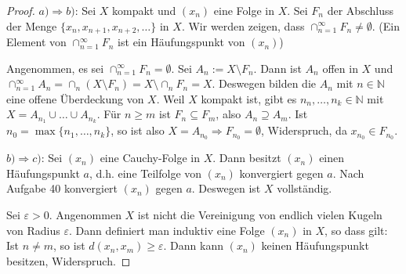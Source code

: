 \documentclass[10pt,a4paper]{report}
\begin{document}
\begin{proof}
  $a) \Rightarrow b)$: Sei $X$ kompakt und $(x_{n})$ eine Folge in $X$.
  Sei $F_{n}$ der Abschluss der Menge $\{ x_{n}, x_{n + 1}, x_{n + 2}, \dots \}$ in $X$.
  Wir werden zeigen, dass $\cap_{n = 1}^{\infty} F_{n} \ne \emptyset$.
  (Ein Element von $\cap_{n = 1}^{\infty} F_{n}$ ist ein Häufungspunkt von $(x_{n})$)

  Angenommen, es sei $\cap_{n = 1}^{\infty} F_{n} = \emptyset$.
  Sei $A_{n} := X \setminus F_{n}$.
  Dann ist $A_{n}$ offen in $X$ und $\cap_{n = 1}^{\infty} A_{n} = \cap_{n} (X \setminus F_{n}) = X \setminus \cap_{n} F_{n} = X$.
  Deswegen bilden die $A_{n}$ mit $n \in \mathbb{N}$ eine offene Überdeckung von $X$.
  Weil $X$ kompakt ist, gibt es $n_{n}, \dots, n_{k} \in \mathbb{N}$ mit $X = A_{n_{1}} \cup \dots \cup A_{n_{k}}$.
  Für $n \ge m$ ist $F_{n} \subseteq F_{m}$, also $A_{n} \supseteq A_{m}$.
  Ist $n_{0} = \max \{ n_{1}, \dots, n_{k} \}$, so ist also $X = A_{n_{0}} \Rightarrow F_{n_{0}} = \emptyset$, Widerspruch, da $x_{n_{0}} \in F_{n_{0}}$.

  $b) \Rightarrow c)$: Sei $(x_{n})$ eine Cauchy-Folge in $X$.
  Dann besitzt $(x_{n})$ einen Häufungspunkt $a$, d.h. eine Teilfolge von $(x_{n})$ konvergiert gegen $a$.
  Nach Aufgabe 40 konvergiert $(x_{n})$ gegen $a$.
  Deswegen ist $X$ vollständig.

  Sei $\varepsilon > 0$.
  Angenommen $X$ ist nicht die Vereinigung von endlich vielen Kugeln von Radius $\varepsilon$.
  Dann definiert man induktiv eine Folge $(x_{n})$ in $X$, so dass gilt: Ist $n \ne m$, so ist $d(x_{n}, x_{m}) \ge \varepsilon$.
  Dann kann $(x_{n})$ keinen Häufungspunkt besitzen, Widerspruch.


\end{proof}
\end{document}
